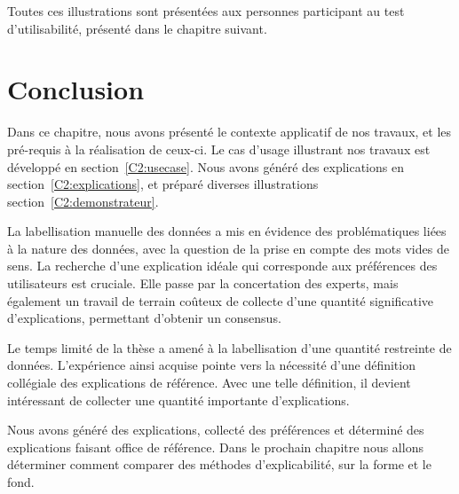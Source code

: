 Toutes ces illustrations sont présentées aux personnes participant au test d'utilisabilité, présenté dans le chapitre suivant.

\section{Conclusion}

Dans ce chapitre, nous avons présenté le contexte applicatif de nos travaux, et les pré-requis à la réalisation de ceux-ci. Le cas d'usage illustrant nos travaux est développé en section~\ref{C2:usecase}. Nous avons généré des explications en section~\ref{C2:explications}, et préparé diverses illustrations section~\ref{C2:demonstrateur}.

La labellisation manuelle des données a mis en évidence des problématiques liées à la nature des données, avec la question de la prise en compte des mots vides de sens. La recherche d'une explication idéale qui corresponde aux préférences des utilisateurs est cruciale. Elle passe par la concertation des experts, mais également un travail de terrain coûteux de collecte d'une quantité significative d'explications, permettant d'obtenir un consensus.

Le temps limité de la thèse a amené à la labellisation d'une quantité restreinte de données. L'expérience ainsi acquise pointe vers la nécessité d'une définition collégiale des explications de référence. Avec une telle définition, il devient intéressant de collecter une quantité importante d'explications.

Nous avons généré des explications, collecté des préférences et déterminé des explications faisant office de référence. Dans le prochain chapitre nous allons déterminer comment comparer des méthodes d'explicabilité, sur la forme et le fond.

